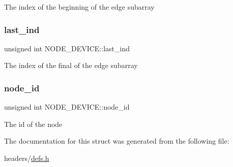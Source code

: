 The index of the beginning of the edge subarray \mbox{\label{structNODE__DEVICE_aa13774c8a904d4696fd8e9c91fcc604c}} 
\subsubsection{\texorpdfstring{last\+\_\+ind}{last\_ind}}
{\footnotesize\ttfamily unsigned int N\+O\+D\+E\+\_\+\+D\+E\+V\+I\+C\+E\+::last\+\_\+ind}

The index of the final of the edge subarray \mbox{\label{structNODE__DEVICE_ab0d37b3b13013ae6887a4fd809f7852e}} 
\subsubsection{\texorpdfstring{node\+\_\+id}{node\_id}}
{\footnotesize\ttfamily unsigned int N\+O\+D\+E\+\_\+\+D\+E\+V\+I\+C\+E\+::node\+\_\+id}

The id of the node 

The documentation for this struct was generated from the following file\+:\begin{DoxyCompactItemize}
\item 
headers/\hyperlink{defs_8h}{defs.\+h}\end{DoxyCompactItemize}

